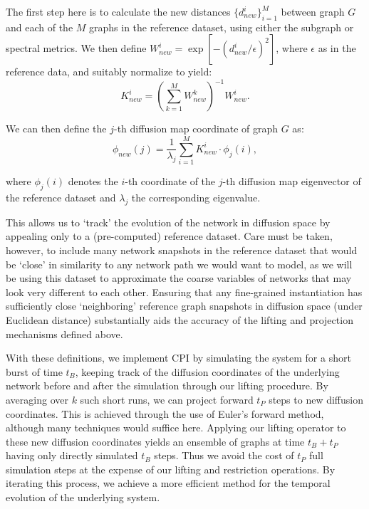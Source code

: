 The first step here is to calculate the new distances
$\{d^i_{new}\}_{i = 1}^M$ between graph $G$ and each of the $M$ graphs
in the reference dataset, using either the subgraph or spectral
metrics. We then define
$W^i_{new} = \exp{[-(d^i_{new}/\epsilon)^2 ]}$, where $\epsilon$ as in
the reference data, and suitably normalize to yield:
\begin{equation}
  K^i_{new} = \left( \sum_{k = 1}^M W_{new}^k \right)^{-1} W^i_{new}.
\end{equation}

\noindent We can then define the $j$-th diffusion map coordinate of
graph $G$ as:
\begin{equation}
  \phi_{new}(j) = \frac{1}{\lambda_j} \sum_{i = 1}^M K^i_{new} \cdot \phi_j(i),
\end{equation}

\noindent where $\phi_j(i)$ denotes the $i$-th coordinate of the
$j$-th diffusion map eigenvector of the reference dataset and
$\lambda_j$ the corresponding eigenvalue.

This allows us to `track' the evolution of the network in diffusion
space by appealing only to a (pre-computed) reference dataset. Care
must be taken, however, to include many network snapshots in the
reference dataset that would be `close' in similarity to any network
path we would want to model, as we will be using this dataset to
approximate the coarse variables of networks that may look very
different to each other. Ensuring that any fine-grained instantiation
has sufficiently close `neighboring' reference graph snapshots in
diffusion space (under Euclidean distance) substantially aids the
accuracy of the lifting and projection mechanisms defined above.

With these definitions, we implement CPI by simulating the system for
a short burst of time $t_B$, keeping track of the diffusion
coordinates of the underlying network before and after the simulation
through our lifting procedure. By averaging over $k$ such short runs,
we can project forward $t_P$ steps to new diffusion coordinates. This
is achieved through the use of Euler's forward method, although many
techniques would suffice here. Applying our lifting operator to these
new diffusion coordinates yields an ensemble of graphs at time
$t_B + t_P$ having only directly simulated $t_B$ steps. Thus we avoid
the cost of $t_P$ full simulation steps at the expense of our lifting
and restriction operations. By iterating this process, we achieve a
more efficient method for the temporal evolution of the underlying
system.

